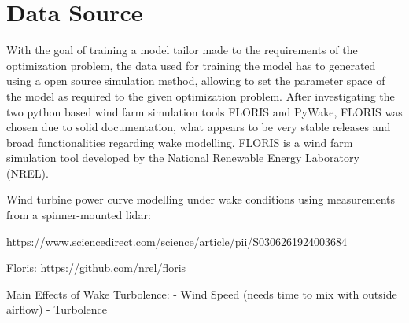 
\chapter{Data Source}\label{chapter:introduction}

With the goal of training a model tailor made to the requirements of the optimization problem, the data used for training the model has to generated using a open source simulation method, allowing to set the parameter space of the model as required to the given optimization problem. After investigating the two python based wind farm simulation tools FLORIS and PyWake, FLORIS was chosen due to solid documentation, what appears to be very stable releases and broad functionalities regarding wake modelling. FLORIS is a wind farm simulation tool developed by the National Renewable Energy Laboratory (NREL).



Wind turbine power curve modelling under wake conditions using measurements from a spinner-mounted lidar:

https://www.sciencedirect.com/science/article/pii/S0306261924003684

Floris:
https://github.com/nrel/floris



Main Effects of Wake Turbolence: 
- Wind Speed (needs time to mix with outside airflow)
- Turbolence
